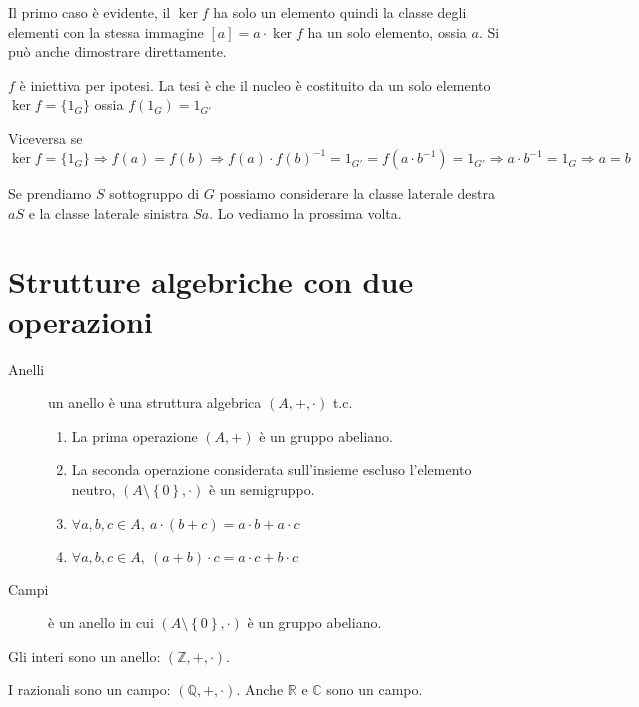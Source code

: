 Il primo caso \`e evidente, il $\ker f$ ha solo un elemento quindi la classe degli elementi con la stessa immagine $[a] = a \cdot \ker f$ ha un solo elemento, ossia $a$. Si pu\`o anche dimostrare direttamente.

$f$ \`e iniettiva per ipotesi. La tesi \`e che il nucleo \`e costituito da un solo elemento $\ker f = \{ 1_G \} $ ossia $f(1_G) = 1_{G'}$

Viceversa se $\ker f = \{ 1_G \} \Rightarrow f(a) = f(b) \Rightarrow f(a) \cdot f(b)^{-1} = 1_{G'} = f(a \cdot b^{-1}) = 1_{G'} \Rightarrow a \cdot b^{-1} = 1_G \Rightarrow a = b$

Se prendiamo $S$ sottogruppo di $G$ possiamo considerare la classe laterale destra $a S$ e la classe laterale sinistra $S a$. Lo vediamo la prossima volta. 






\section{Strutture algebriche con due operazioni}

\begin{description}
    \item[Anelli] un anello \`e una struttura algebrica $(A, +, \cdot)$ t.c. 
    \begin{enumerate}
        \item La prima operazione $\left( A, + \right )$ \`e un gruppo abeliano.
        \item La seconda operazione considerata sull'insieme escluso l'elemento neutro, $(A \setminus \left \{ 0 \right \}, \cdot )$ \`e un semigruppo.
        \item $ \forall a, b, c \in A , \ a \cdot (b + c) = a \cdot b + a \cdot c $
        \item $ \forall a, b, c \in A , \ (a + b) \cdot c = a \cdot c + b \cdot c $
    \end{enumerate}
    \item[Campi] \`e un anello in cui $( A \setminus \left \{ 0 \right \}, \cdot )$ \`e un gruppo abeliano.
\end{description}

Gli interi sono un anello: $\left ( \mathbb{Z}, +, \cdot \right )$.

I razionali sono un campo: $\left ( \mathbb{Q}, +, \cdot \right )$. Anche $\mathbb{R}$ e $\mathbb{C}$ sono un campo.
